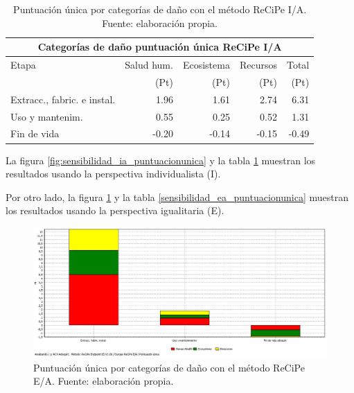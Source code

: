 \begin{table}[!htb]
\centering
\begin{tabular}{p{6cm}rrrr}
\toprule
\multicolumn{5}{c}{Categorías de daño puntuación única ReCiPe I/A}\\
\midrule
Etapa & Salud hum. & Ecosistema & Recursos & Total\\
 & (Pt) & (Pt) & (Pt) & (Pt)\\
\midrule
Extracc., fabric. e instal. & 1.96 & 1.61 & 2.74 & 6.31\\
Uso y mantenim. & 0.55 & 0.25 & 0.52 & 1.31\\
Fin de vida & -0.20 & -0.14 & -0.15 & -0.49\\
\bottomrule
\end{tabular}
\caption[Puntuación única por categorías de daño con el método ReCiPe I/A.]{Puntuación única por categorías de daño con el método ReCiPe I/A. Fuente: elaboración propia.}
\label{sensibilidad_ia_puntuacionunica}
\end{table}

La figura \ref{fig:sensibilidad_ia_puntuacionunica} y la tabla \ref{sensibilidad_ia_puntuacionunica} muestran los resultados usando la perspectiva individualista (I).

Por otro lado, la figura \ref{fig:sensibilidad_ea_puntuacionunica} y la tabla \ref{sensibilidad_ea_puntuacionunica} muestran los resultados usando la perspectiva igualitaria (E).

\begin{figure}[!htb]
\centering
\includegraphics[width=15cm]{img/sensibilidad_ea_puntuacionunica.png}
\caption[Puntuación única por categorías de daño con el método ReCiPe E/A.]{Puntuación única por categorías de daño con el método ReCiPe E/A. Fuente: elaboración propia.}
\label{fig:sensibilidad_ea_puntuacionunica}
\end{figure}

